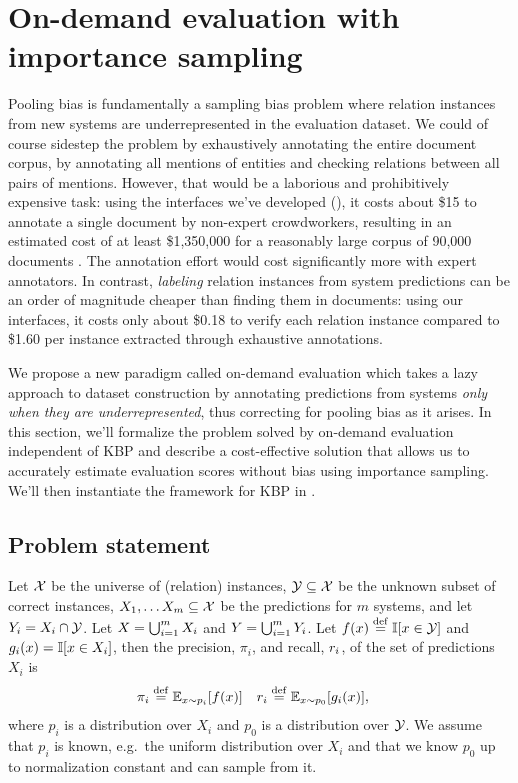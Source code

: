 \section{On-demand evaluation with importance sampling}
\label{sec:method}

Pooling bias is fundamentally a sampling bias problem where relation instances from new systems are underrepresented in the evaluation dataset.
We could of course sidestep the problem by exhaustively annotating the entire document corpus, by annotating all mentions of entities and checking relations between all pairs of mentions. However, that would be a laborious and prohibitively expensive task:
using the interfaces we've developed (), it costs about \$15 to annotate a single document by non-expert crowdworkers, resulting in an estimated cost of at least \$1,350,000 for a reasonably large corpus of 90,000 documents \citep{dang2016kbp}.
The annotation effort would cost significantly more with expert annotators.
In contrast, \textit{labeling} 
relation instances from system predictions
can be an order of magnitude cheaper than finding them in documents: using our interfaces, it costs only about \$0.18 to verify each relation instance compared to \$1.60 per instance extracted through exhaustive annotations.

We propose a new paradigm called on-demand evaluation which takes a lazy approach to dataset construction by annotating predictions from systems \textit{only when they are underrepresented}, thus correcting for pooling bias as it arises.
In this section, we'll formalize the problem solved by on-demand evaluation independent of KBP and describe a cost-effective solution that allows us to accurately estimate evaluation scores
without bias using importance sampling.
We'll then instantiate the framework for KBP in .

\subsection{Problem statement}
Let $\mathcal{X}$ be the universe of %
(relation) instances,
  $\mathcal{Y} \subseteq \mathcal{X}$ be the unknown subset of correct instances,
  $X_1, \ldots X_m \subseteq \mathcal{X}$ be the predictions for $m$ systems,
  and let $Y_i = X_i \cap \mathcal{Y}$.
Let $X = \bigcup_{i=1}^m X_i$ and $Y = \bigcup_{i=1}^m Y_i$.
Let $f(x) \stackrel{\rm def}{=} \mathbb{I}[x \in \mathcal{Y}]$ and $g_i(x) = \mathbb{I}[x \in X_i]$, then the precision, $\pi_i$, and recall, $r_i$, of the set of predictions $X_i$ is
\begin{align*}
  \pi_i  &\stackrel{\rm def}{=} \mathbb{E}_{x \sim p_i}[f(x)] &
  r_i &\stackrel{\rm def}{=} \mathbb{E}_{x \sim p_0}[g_i(x)],
\end{align*}
where $p_i$ is a distribution over $X_i$ and $p_0$ is a distribution over $\mathcal{Y}$.
We assume that $p_i$ is known, e.g.\, the uniform distribution over $X_i$
and that we know $p_0$ up to normalization constant and can sample from it.

